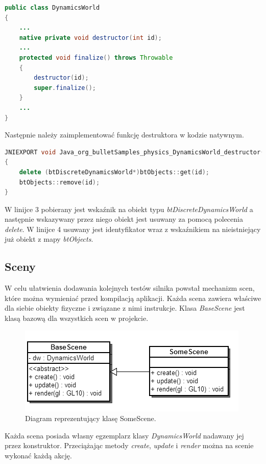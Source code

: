 \begin{lstlisting}[language=Java, caption=Przeciążenie metody \emph{finalize}
na przykładzie klasy \emph{DynamicsWorld}] public class DynamicsWorld
{
	...
	native private void destructor(int id);
	...
	protected void finalize() throws Throwable
	{
		destructor(id);
		super.finalize();
	}
	...
}
\end{lstlisting}

Następnie należy zaimplementować funkcję destruktora w kodzie natywnym.

\begin{lstlisting}[language=c++, caption=Implementacja funkcji
\emph{destructor} na przykładzie klasy \emph{DynamicsWorld}]
JNIEXPORT void Java_org_bulletSamples_physics_DynamicsWorld_destructor( JNIEnv* env, jobject self, jint id )
{
	delete (btDiscreteDynamicsWorld*)btObjects::get(id);
	btObjects::remove(id);
}
\end{lstlisting}

W linijce 3 pobierany jest wskaźnik na obiekt typu
\emph{btDiscreteDynamicsWorld} a następnie wskazywany przez niego obiekt jest
usuwany za pomocą polecenia \emph{delete}. W linijce 4 usuwany jest
identyfikator wraz z wskaźnikiem na nieistniejący już obiekt z mapy
\emph{btObjects}.

\subsection{Sceny}
W celu ułatwienia dodawania kolejnych testów silnika powstał mechanizm scen,
które można wymieniać przed kompilacją aplikacji. Każda scena zawiera właściwe
dla siebie obiekty fizyczne i związane z nimi instrukcje. Klasa \emph{BaseScene}
jest klasą bazową dla wszystkich scen w projekcie.

\begin{figure}
\centering
\includegraphics[scale=0.6]{./img/SceneClassDiagram.png}
\caption{Diagram reprezentujący klasę SomeScene.}
\label{fig:sceneClassDiagram}
\end{figure}

Każda scena posiada własny egzemplarz klasy \emph{DynamicsWorld} nadawany jej
przez konstruktor. Przeciążając metody \emph{create}, \emph{update} i
\emph{render} można na scenie wykonać każdą akcję.

